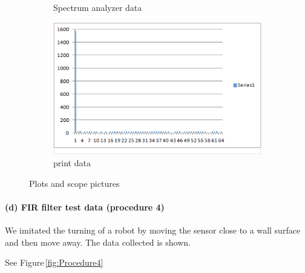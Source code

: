 \documentclass[a4paper]{article}
\newlength{\pic}
\begin{document}
\begin{figure}[htp]
\begin{subfigure}[H]{\picb}
	\caption{Spectrum analyzer data}
	\end{subfigure}
	\begin{subfigure}[H]{\picc}
	\includegraphics[width=\picc]{Plots/P3_FFT2000}
	\caption{print data}
	\end{subfigure}
\caption{Plots and scope pictures}
\label{fig:Procedure3FFT}
\end{figure}

\paragraph{(d) FIR filter test data (procedure 4) \\}
We imitated the turning of a robot by moving the sensor close to a wall surface and then move away.
The data collected is shown.

See Figure\,\ref{fig:Procedure4}

\setlength{\pica}{4cm}
\setlength{\picb}{8cm}
\end{document}
